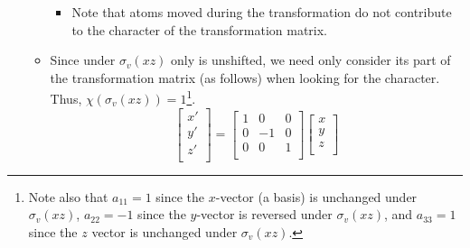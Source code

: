 \documentclass[../notes.tex]{subfiles}
\begin{document}
\begin{itemize}
\begin{itemize}
\begin{center}
        \end{center}
        \begin{itemize}
            \item Note that atoms moved during the transformation do not contribute to the character of the transformation matrix.
        \end{itemize}
        \item Since under $\sigma_v(xz)$ only  is unshifted, we need only consider its part of the transformation matrix (as follows) when looking for the character. Thus, $\chi(\sigma_v(xz))=1$\footnote{Note also that $a_{11}=1$ since the $x$-vector (a basis) is unchanged under $\sigma_v(xz)$, $a_{22}=-1$ since the $y$-vector is reversed under $\sigma_v(xz)$, and $a_{33}=1$ since the $z$ vector is unchanged under $\sigma_v(xz)$.}.
        \begin{equation*}
            \begin{bmatrix}
                x'\\
                y'\\
                z'\\
            \end{bmatrix}
            =
            \begin{bmatrix}
                1 & 0 & 0\\
                0 & -1 & 0\\
                0 & 0 & 1\\
            \end{bmatrix}
            \begin{bmatrix}
                x\\
                y\\
                z\\
            \end{bmatrix}

\end{equation*}
\end{itemize}
\end{itemize}
\end{document}
